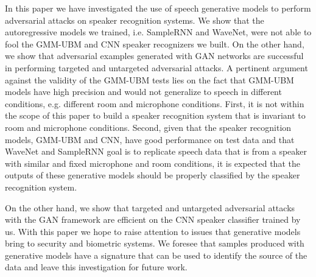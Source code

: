 In this paper we have investigated the use of speech generative models to perform adversarial attacks on speaker recognition systems. We show that the autoregressive models we trained, i.e. SampleRNN and WaveNet, were not able to fool the GMM-UBM and CNN speaker recognizers we built. On the other hand, we show that adversarial examples generated with GAN networks are successful in performing targeted and untargeted adversarial attacks. A pertinent argument against the validity of the GMM-UBM tests lies on the fact that GMM-UBM models have high precision and would not generalize to speech in different conditions, e.g. different room and microphone conditions. First, it is not within the scope of this paper to build a speaker recognition system that is invariant to room and microphone conditions. Second, given that the speaker recognition models, GMM-UBM and CNN, have good performance on test data and that WaveNet and SampleRNN goal is to replicate speech data that is from a speaker with similar and fixed microphone and room conditions, it is expected that the outputs of these generative models should be properly classified by the speaker recognition system.

On the other hand, we show that targeted and untargeted adversarial attacks with the GAN framework are efficient on the CNN speaker classifier trained by us. With this paper we hope to raise attention to issues that generative models bring to security and biometric systems. We foresee that samples produced with generative models have a signature that can be used to identify the source of the data and leave this investigation for future work.
